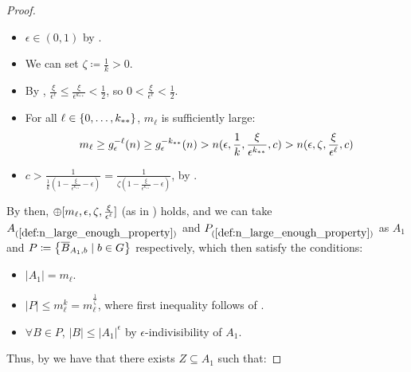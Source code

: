 \begin{lemma}[Claim 4.21]
\begin{proof}
\begin{itemize}
                \item $\epsilon \in (0,1)$ by .
                \item We can set $\zeta \coloneqq \frac{1}{k} > 0$.
                \item By ,
                    $\frac{\xi}{\epsilon^\ell} \leq \frac{\xi}{\epsilon^{k_{**}}} < \frac{1}{2}$, so $0 < \frac{\xi}{\epsilon^\ell} < \frac{1}{2}$.
                \item For all $\ell \in \{ 0,\dots,k_{**} \}$, $m_\ell$ is sufficiently large:
                    \[
                        m_\ell \geq g_\epsilon^{-\ell}(n) \geq g_\epsilon^{-k_{**}}(n) > n( \epsilon, \frac{1}{k},
                        \frac{\xi}{\epsilon^{k_{**}}}, c ) > n( \epsilon, \zeta, \frac{\xi}{\epsilon^{\ell}}, c )
                    \]
                \item $c > \frac{1}{\frac{1}{k} (1 - \frac{\xi}{\epsilon^{k_{**}}} - \epsilon)}
                    = \frac{1}{\zeta (1 - \frac{\xi}{\epsilon^{k_{**}}} - \epsilon)}$, by .
            \end{itemize}
            By  then, $\oplus[ m_\ell, \epsilon, \zeta, \frac{\xi}{\epsilon^\ell} ]$
            (as in ) holds, and we can take
            $A_{(\ref{def:n_large_enough_property})}$ and $P_{(\ref{def:n_large_enough_property})}$ as $A_1$ and
            $P \coloneqq \bigl\{ \overline{B}_{A_1,b} \mid b \in G \bigr\}$ respectively, which then satisfy the conditions:
            \begin{itemize}
                \item $|A_1| = m_\ell$.
                \item $|P| \leq m_\ell^k = m_\ell^{\frac{1}{\zeta}}$, where first inequality follows 
                    of .
                \item $\forall B \in P$, $|B| \leq |A_1|^\epsilon$ by $\epsilon$-indivisibility of $A_1$.
            \end{itemize}
            Thus, by  we have that there exists $Z \subseteq A_1$ such that:
\end{proof}
\end{lemma}
